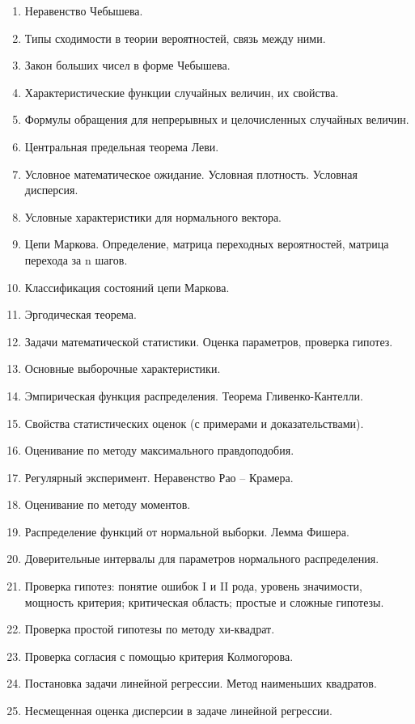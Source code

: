 \documentclass[14pt]{extarticle}
\theoremstyle{breakstyle}
\begin{document}
\begin{enumerate}[noitemsep, topsep=0pt]
    \item Неравенство Чебышева.
    \item Типы сходимости в теории вероятностей, связь между ними.
    \item Закон больших чисел в форме Чебышева.
    \item Характеристические функции случайных величин, их свойства.
    \item Формулы обращения для непрерывных и целочисленных случайных величин.
    \item Центральная предельная теорема Леви.
    \item Условное математическое ожидание. Условная плотность. Условная дисперсия.
    \item Условные характеристики для нормального вектора.
    \item Цепи Маркова. Определение, матрица переходных вероятностей, матрица перехода за n шагов.
    \item Классификация состояний цепи Маркова.
    \item Эргодическая теорема.
    \item Задачи математической статистики. Оценка параметров, проверка гипотез.
    \item Основные выборочные характеристики.
    \item Эмпирическая функция распределения. Теорема Гливенко-Кантелли.
    \item Свойства статистических оценок (с примерами и доказательствами).
    \item Оценивание по методу максимального правдоподобия.
    \item Регулярный эксперимент. Неравенство Рао – Крамера.
    \item Оценивание по методу моментов.
    \item Распределение функций от нормальной выборки. Лемма Фишера.
    \item Доверительные интервалы для параметров нормального распределения.
    \item Проверка гипотез: понятие ошибок I и II рода, уровень значимости, мощность критерия; критическая область; простые и сложные гипотезы.
    \item Проверка простой гипотезы по методу хи-квадрат.
    \item Проверка согласия с помощью критерия Колмогорова.
    \item Постановка задачи линейной регрессии. Метод наименьших квадратов.
    \item Несмещенная оценка дисперсии в задаче линейной регрессии.
\end{enumerate}
\end{document}
